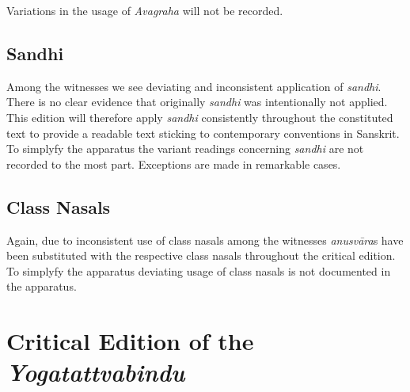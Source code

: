 \documentclass[12pt]{article}%
\begin{document}
Variations in the usage of \textit{Avagraha} will not be recorded. 

\subsection{Sandhi}

Among the witnesses we see deviating and inconsistent application of \textit{sandhi}. There is no clear evidence that originally \textit{sandhi} was intentionally not applied. This edition will therefore apply \textit{sandhi} consistently throughout the constituted text to provide a readable text sticking to contemporary conventions in Sanskrit. To simplyfy the apparatus the variant readings concerning \textit{sandhi} are not recorded to the most part. Exceptions are made in remarkable cases. 

\subsection{Class Nasals}

Again, due to inconsistent use of class nasals among the witnesses \textit{anusvāra}s have been substituted with the respective class nasals throughout the critical edition. To simplyfy the apparatus deviating usage of class nasals is not documented in the apparatus.
\clearpage

\section{Critical Edition of the \textit{Yogatattvabindu}}
  
\end{document}
